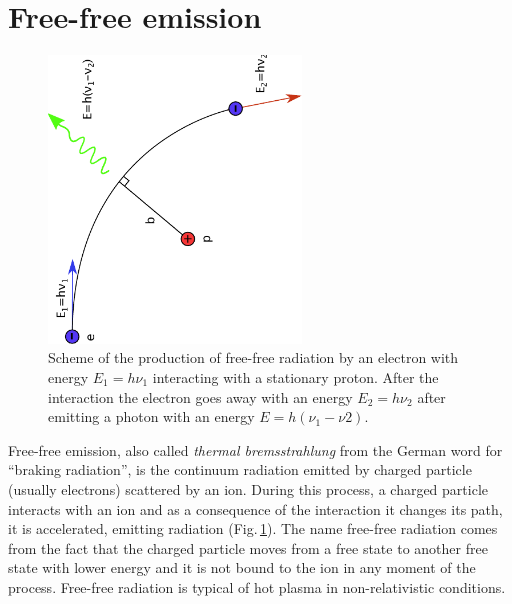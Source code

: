 \documentclass[../main.tex]{subfiles}
\begin{document}
\section{Free-free emission}

\begin{figure}
\centering
\includegraphics[width=0.6\textwidth, angle =270]{images/free_free.pdf} 
\caption[]{Scheme of the production of free-free radiation by an electron with energy $E_1 = h\nu_1$ interacting with a stationary proton. After the interaction the electron goes away with an energy $E_2=h\nu_2$ after emitting a photon with an energy $E=h(\nu_1-\nu2)$.}
\label{fig:free_free}
\end{figure}

Free-free emission, also called \emph{thermal bremsstrahlung} from the German word for ``braking radiation'', is the continuum radiation emitted by charged particle (usually electrons) scattered by an ion.
During this process, a charged particle interacts with an ion and as a consequence of the interaction it changes its path, it is accelerated, emitting radiation (Fig.\,\ref{fig:free_free}).
The name free-free radiation comes from the fact that the charged particle moves from a free state to another free state with lower energy and it is not bound to the ion in any moment of the process.
Free-free radiation is typical of hot plasma in non-relativistic conditions.
\end{document}
